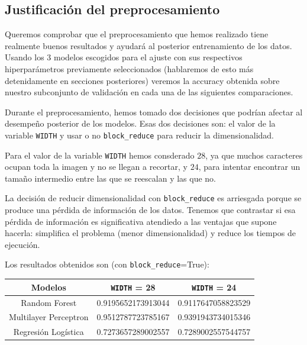 \documentclass[a4]{article}
\begin{document}
\subsection{Justificación del preprocesamiento}

Queremos comprobar que el preprocesamiento que hemos realizado tiene realmente buenos resultados y ayudará al posterior entrenamiento de los datos. Usando los 3 modelos escogidos para el ajuste con sus respectivos hiperparámetros previamente seleccionados (hablaremos de esto más detenidamente en secciones posteriores) veremos la accuracy obtenida sobre nuestro subconjunto de validación en cada una de las siguientes comparaciones.


Durante el preprocesamiento, hemos tomado dos decisiones que podrían afectar al desempeño posterior de los modelos. Esas dos decisiones son: el valor de la variable \texttt{WIDTH} y usar o no \texttt{block\_reduce} para reducir la dimensionalidad.

Para el valor de la variable \texttt{WIDTH} hemos consderado $28$, ya que muchos caracteres ocupan toda la imagen y no se llegan a recortar, y $24$, para intentar encontrar un tamaño intermedio entre las que se reescalan y las que no.

La decisión de reducir dimensionalidad con \texttt{block\_reduce} es arriesgada porque se produce una pérdida de información de los datos. Tenemos que contrastar si esa pérdida de información es significativa atendiedo a las ventajas que supone hacerla: simplifica el problema (menor dimensionalidad) y reduce los tiempos de ejecución.

Los resultados obtenidos son (con \texttt{block\_reduce}=True):

\begin{center}
\begin{tabular}{|c|c|c|}
\hline
\multicolumn{1}{|c|}{Modelos}& \textbf{\texttt{WIDTH} = 28} &
\textbf{\texttt{WIDTH} = 24}  \\ \hline
  Random Forest         & 0.9195652173913044 & 0.9117647058823529 \\
  Multilayer Perceptron & 0.9512787723785167 & 0.9391943734015346 \\
  Regresión Logística   & 0.7273657289002557 & 0.7289002557544757 \\\hline
\end{tabular}
\end{center}
\end{document}
